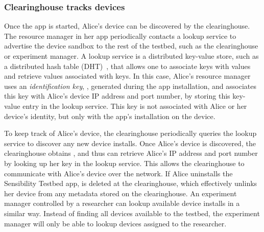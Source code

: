 \subsubsection{Clearinghouse tracks devices}\label{sec-case1}
Once the app is started, Alice's device can be discovered by 
the clearinghouse. The resource manager in her app periodically contacts 
a lookup service to advertise the device sandbox to the rest of the testbed, 
such as the clearinghouse or experiment manager. 
A lookup service is a distributed key-value store, such as a 
distributed hash table (DHT)~\cite{dht}, that allows one to associate 
keys with values and retrieve values associated with keys. In this case, 
Alice's resource manager uses an \textit{identification key}, , 
generated during the app installation, and associates this key 
with Alice's device IP address and port number, by 
storing this key-value entry in the lookup service. This key is not 
associated with Alice or her device's identity, but only with the app's 
installation on the device. 


To keep track of Alice's device, the
clearinghouse periodically queries the lookup service to
discover any new device installs. Once Alice's device is discovered, the
clearinghouse obtains , and thus
can retrieve Alice's  IP address and port number by 
looking up her key in the lookup service. This allows the clearinghouse
to communicate with Alice's device over the network.
If Alice uninstalls the Sensibility Testbed app, 
 is deleted at the clearinghouse, which effectively unlinks
her device from any metadata stored on the clearinghouse.
An experiment manager controlled by a researcher can lookup
available device installs in a similar way. Instead of finding all devices
available to the testbed, the experiment manager will only be able to 
lookup devices assigned to the researcher. 

